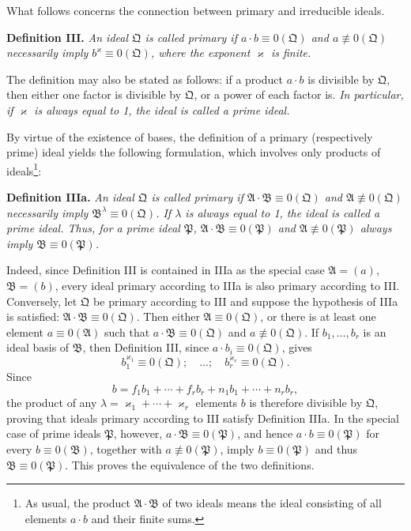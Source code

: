 \documentclass[11pt]{article}
\providecommand{\ideal}[1]{\mathfrak{#1}}
\begin{document}
What follows concerns the connection between primary and irreducible ideals.

\textbf{Definition III.} \emph{An ideal $\ideal Q$ is called primary if $a\cdot b\equiv0(\ideal Q)$ and $a\not\equiv0(\ideal Q)$ necessarily imply $b^\varkappa\equiv0(\ideal Q)$, where the exponent $\varkappa$ is finite.}

The definition may also be stated as follows: if a product $a\cdot b$ is divisible by $\ideal Q$, then either one factor is divisible by $\ideal Q$, or a power of each factor is. \emph{In particular, if $\varkappa$ is always equal to 1, the ideal is called a prime ideal.}

By virtue of the existence of bases, the definition of a primary (respectively prime) ideal yields the following formulation, which involves only products of ideals\footnote{As usual, the product $\ideal A\cdot\ideal B$ of two ideals means the ideal consisting of all elements $a\cdot b$ and their finite sums.}:

\textbf{Definition IIIa.} \emph{An ideal $\ideal Q$ is called primary if $\ideal A\cdot\ideal B\equiv0(\ideal Q)$ and $\ideal A\not\equiv0(\ideal Q)$ necessarily imply $\ideal B^\lambda\equiv0(\ideal Q)$. If $\lambda$ is always equal to 1, the ideal is called a prime ideal. Thus, for a prime ideal $\ideal P$, $\ideal A\cdot\ideal B\equiv0(\ideal P)$ and $\ideal A\not\equiv0(\ideal P)$ always imply $\ideal B\equiv0(\ideal P)$.}

Indeed, since Definition III is contained in IIIa as the special case $\ideal A=(a)$, $\ideal B=(b)$, every ideal primary according to IIIa is also primary according to III. Conversely, let $\ideal Q$ be primary according to III and suppose the hypothesis of IIIa is satisfied: $\ideal A\cdot\ideal B\equiv0(\ideal Q)$. Then either $\ideal A\equiv0(\ideal Q)$, or there is at least one element $a\equiv0(\ideal A)$ such that $a\cdot\ideal B\equiv0(\ideal Q)$ and $a\not\equiv0(\ideal Q)$. If $b_1,\ldots,b_r$ is an ideal basis of $\ideal B$, then Definition III, since $a\cdot b_i\equiv0(\ideal Q)$, gives
\[
 b_1^{\varkappa_1}\equiv0(\ideal Q);\quad\ldots;\quad
 b_r^{\varkappa_r}\equiv0(\ideal Q).
\]
Since
\[
 b=f_1b_1+\cdots+f_r b_r+n_1b_1+\cdots+n_r b_r,
\]
the product of any $\lambda=\varkappa_1+\cdots+\varkappa_r$ elements $b$ is therefore divisible by $\ideal Q$, proving that ideals primary according to III satisfy Definition IIIa. In the special case of prime ideals $\ideal P$, however, $a\cdot\ideal B\equiv0(\ideal P)$, and hence $a\cdot b\equiv0(\ideal P)$ for every $b\equiv0(\ideal B)$, together with $a\not\equiv0(\ideal P)$, imply $b\equiv0(\ideal P)$ and thus $\ideal B\equiv0(\ideal P)$. This proves the equivalence of the two definitions.
\end{document}
